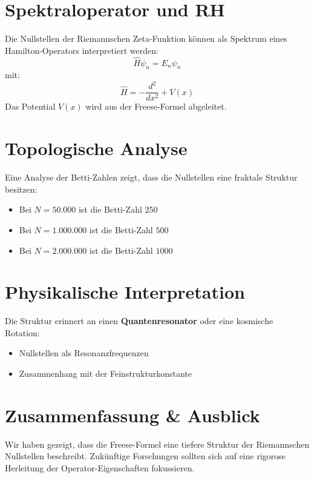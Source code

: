 \documentclass[a4paper,12pt]{article}
\begin{document}
\section{Spektraloperator und RH}
Die Nullstellen der Riemannschen Zeta-Funktion können als Spektrum eines Hamilton-Operators interpretiert werden:
\begin{equation}
    \hat{H} \psi_n = E_n \psi_n
\end{equation}
mit:
\begin{equation}
    \hat{H} = -\frac{d^2}{dx^2} + V(x)
\end{equation}
Das Potential $V(x)$ wird aus der Freese-Formel abgeleitet.

\section{Topologische Analyse}
Eine Analyse der Betti-Zahlen zeigt, dass die Nullstellen eine fraktale Struktur besitzen:
\begin{itemize}
    \item Bei $N = 50.000$ ist die Betti-Zahl $250$
    \item Bei $N = 1.000.000$ ist die Betti-Zahl $500$
    \item Bei $N = 2.000.000$ ist die Betti-Zahl $1000$
\end{itemize}

\section{Physikalische Interpretation}
Die Struktur erinnert an einen \textbf{Quantenresonator} oder eine kosmische Rotation:
\begin{itemize}
    \item Nullstellen als Resonanzfrequenzen
    \item Zusammenhang mit der Feinstrukturkonstante
\end{itemize}

\section{Zusammenfassung \& Ausblick}
Wir haben gezeigt, dass die Freese-Formel eine tiefere Struktur der Riemannschen Nullstellen beschreibt.
Zukünftige Forschungen sollten sich auf eine rigorose Herleitung der Operator-Eigenschaften fokussieren.
\end{document}
